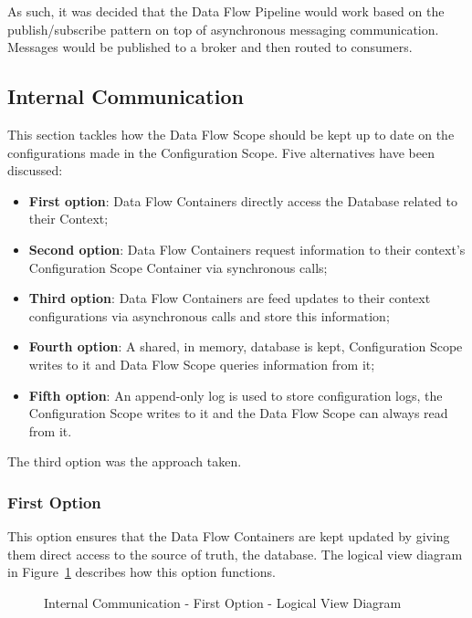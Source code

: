 As such, it was decided that the Data Flow Pipeline would work based on the publish/subscribe pattern on top of asynchronous messaging communication. Messages would be published to a broker and then routed to consumers.

\subsection{Internal Communication}
\label{subsec:design:alternatives:internal}

This section tackles how the Data Flow Scope should be kept up to date on the configurations made in the Configuration Scope. Five alternatives have been discussed:

\begin{itemize}
   \item \textbf{First option}: Data Flow Containers directly access the Database related to their Context;
   \item \textbf{Second option}: Data Flow Containers request information to their context's Configuration Scope Container via synchronous calls;
   \item \textbf{Third option}: Data Flow Containers are feed updates to their context configurations via asynchronous calls and store this information;
   \item \textbf{Fourth option}: A shared, in memory, database is kept, Configuration Scope writes to it and Data Flow Scope queries information from it;
   \item \textbf{Fifth option}: An append-only log is used to store configuration logs, the Configuration Scope writes to it and the Data Flow Scope can always read from it.  
\end{itemize}

The third option was the approach taken.

\subsubsection*{First Option}
\label{subsubsec:design:alternatives:internal:first}

This option ensures that the Data Flow Containers are kept updated by giving them direct access to the source of truth, the database. The logical view diagram in Figure~\ref{fig:design:alternatives:internal:first:diagram} describes how this option functions.

\begin{figure}[H]
   \centering
   \resizebox{\columnwidth}{!}
   {
      
   }
   \caption[Internal Communication - First Option - Logical View Diagram]{Internal Communication - First Option - Logical View Diagram}
   \label{fig:design:alternatives:internal:first:diagram}
\end{figure}

